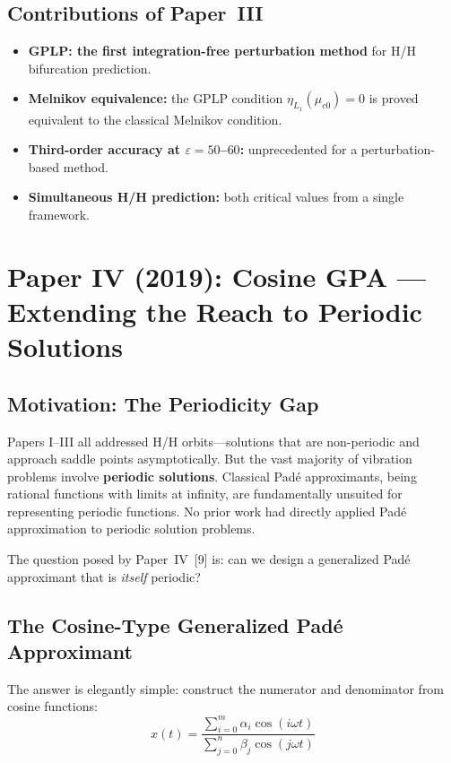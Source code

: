 \documentclass[11pt,a4paper]{article}
\begin{document}
\subsection{Contributions of Paper~III}

\begin{itemize}[leftmargin=2em]
\item \textbf{GPLP: the first integration-free perturbation method} for H/H bifurcation prediction.
\item \textbf{Melnikov equivalence:} the GPLP condition $\eta_{L_1}(\mu_{c0}) = 0$ is proved equivalent to the classical Melnikov condition.
\item \textbf{Third-order accuracy at $\varepsilon = 50$--$60$:} unprecedented for a perturbation-based method.
\item \textbf{Simultaneous H/H prediction:} both critical values from a single framework.
\end{itemize}

\section{Paper IV (2019): Cosine GPA --- Extending the Reach to Periodic Solutions}

\subsection{Motivation: The Periodicity Gap}

Papers I--III all addressed H/H orbits---solutions that are non-periodic and approach saddle points asymptotically. But the vast majority of vibration problems involve \textbf{periodic solutions}. Classical Pad\'e approximants, being rational functions with limits at infinity, are fundamentally unsuited for representing periodic functions. No prior work had directly applied Pad\'e approximation to periodic solution problems.

The question posed by Paper~IV~[9] is: can we design a generalized Pad\'e approximant that is \emph{itself} periodic?

\subsection{The Cosine-Type Generalized Pad\'e Approximant}

The answer is elegantly simple: construct the numerator and denominator from cosine functions:
\begin{equation}
\boxed{x(t) = \frac{\sum_{i=0}^{m} \alpha_i \cos(i\omega t)}{\sum_{j=0}^{n} \beta_j \cos(j\omega t)}}
\label{eq:cosine_gpa}
\end{equation}
\end{document}
